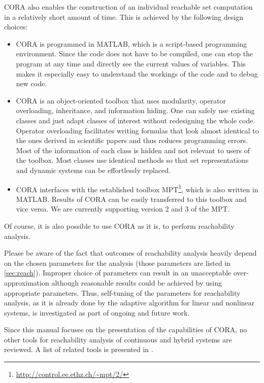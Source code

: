 CORA also enables the construction of an individual reachable set computation in a relatively short amount of time. This is achieved by the following design choices:
\begin{itemize}
 \item CORA is programmed in MATLAB, which is a script-based programming environment. Since the code does not have to be compiled, one can stop the program at any time and directly see the current values of variables. This makes it especially easy to understand the workings of the code and to debug new code. 
 \item CORA is an object-oriented toolbox that uses modularity, operator overloading, inheritance, and information hiding. One can safely use existing classes and just adapt classes of interest without redesigning the whole code. Operator overloading facilitates writing formulas that look almost identical to the ones derived in scientific papers and thus reduces programming errors. Most of the information of each class is hidden and not relevant to users of the toolbox. Most classes use identical methods so that set representations and dynamic systems can be effortlessly replaced.
 \item CORA interfaces with the established toolbox MPT\footnote{\url{http://control.ee.ethz.ch/~mpt/2/}}, which is also written in MATLAB. Results of CORA can be easily transferred to this toolbox and vice versa. We are currently supporting version 2 and 3 of the MPT.
\end{itemize}
Of course, it is also possible to use CORA as it is, to perform reachability analysis. 
\begin{framed}
 Please be aware of the fact that outcomes of reachability analysis heavily depend on the chosen parameters for the analysis (those parameters are listed in \cref{sec:reach}). Improper choice of parameters can result in an unacceptable over-approximation although reasonable results could be achieved by using appropriate parameters. Thus, self-tuning of the parameters for reachability analysis, as it is already done by the adaptive algorithm for linear and nonlinear systems, is investigated as part of ongoing and future work.
\end{framed}
Since this manual focuses on the presentation of the capabilities of CORA, no other tools for reachability analysis of continuous and hybrid systems are reviewed. A list of related tools is presented in \cite{Althoff2015a, Althoff2016a, Althoff2018b}.